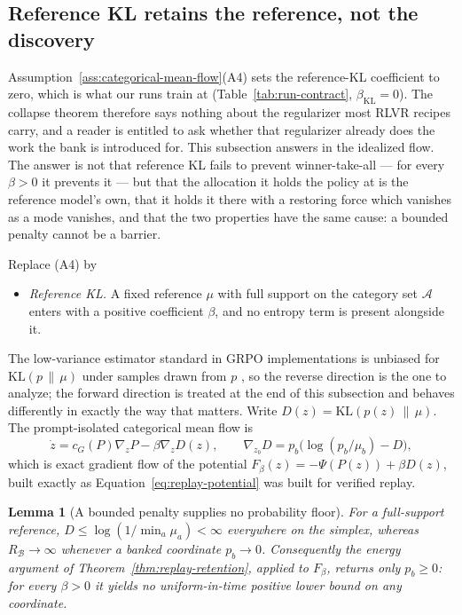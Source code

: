 \documentclass{article}
\newcommand{\1}{\mathbf 1}
\newtheorem{lemma}{Lemma}[section]
\theoremstyle{remark}
\theoremstyle{definition}
\theoremstyle{plain}
\begin{document}
\subsection{Reference KL retains the reference, not the discovery}
\label{app:theory-kl}

Assumption~\ref{ass:categorical-mean-flow}(A4) sets the reference-KL
coefficient to zero, which is what our runs train at
(Table~\ref{tab:run-contract}, $\beta_{\mathrm{KL}}=0$). The collapse theorem
therefore says nothing about the regularizer most RLVR recipes carry, and a
reader is entitled to ask whether that regularizer already does the work the
bank is introduced for. This subsection answers in the idealized flow. The
answer is not that reference KL fails to prevent winner-take-all --- for every
$\beta>0$ it prevents it --- but that the allocation it holds the policy at is
the reference model's own, that it holds it there with a restoring force which
vanishes as a mode vanishes, and that the two properties have the same cause:
a bounded penalty cannot be a barrier.

Replace (A4) by
\begin{itemize}
\item[(A4$'$)] \emph{Reference KL.} A fixed reference $\mu$ with full support
  on the category set $\mathcal A$ enters with a positive coefficient $\beta$,
  and no entropy term is present alongside it.
\end{itemize}
The low-variance estimator standard in GRPO implementations is unbiased for
$\mathrm{KL}(p\,\|\,\mu)$ under samples drawn from $p$
\citep{shao2024deepseekmath}, so the reverse direction is the one to analyze;
the forward direction is treated at the end of this subsection and behaves
differently in exactly the way that matters. Write
$D(z)=\mathrm{KL}(p(z)\,\|\,\mu)$. The prompt-isolated categorical mean flow is
\begin{equation}
  \dot z=c_G(P)\nabla_zP-\beta\nabla_zD(z),
  \qquad
  \nabla_{z_b}D=p_b\big(\log(p_b/\mu_b)-D\big),
  \label{eq:kl-mean-flow}
\end{equation}
which is exact gradient flow of the potential
$F_\beta(z)=-\Psi(P(z))+\beta D(z)$, built exactly as
Equation~\eqref{eq:replay-potential} was built for verified replay.

\begin{lemma}[A bounded penalty supplies no probability floor]
\label{lem:kl-no-barrier}
For a full-support reference, $D\le\log(1/\min_a\mu_a)<\infty$ everywhere on
the simplex, whereas $R_{\mathcal B}\to\infty$ whenever a banked coordinate
$p_b\to0$. Consequently the energy argument of
Theorem~\ref{thm:replay-retention}, applied to $F_\beta$, returns only
$p_b\ge0$: for every $\beta>0$ it yields no uniform-in-time positive lower
bound on any coordinate.
\end{lemma}
\end{document}
